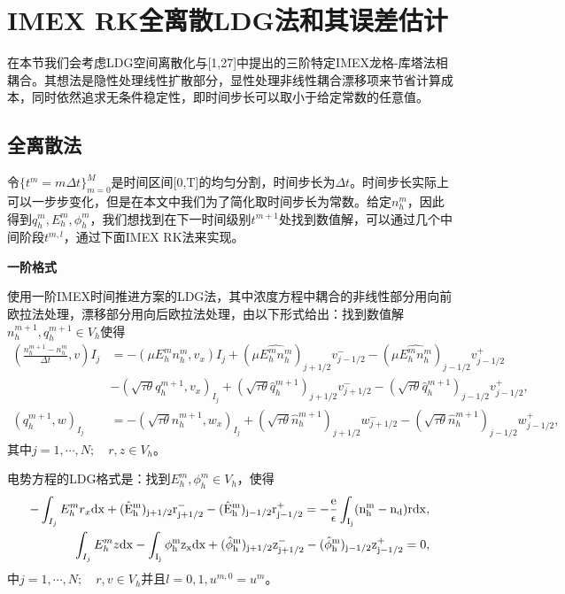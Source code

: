 \documentclass[lang=cn,newtx,10pt,scheme=chinese]{elegantbook}
\begin{document}
\chapter{IMEX RK全离散LDG法和其误差估计}
在本节我们会考虑LDG空间离散化与[1,27]中提出的三阶特定IMEX龙格-库塔法相耦合。其想法是隐性处理线性扩散部分，显性处理非线性耦合漂移项来节省计算成本，同时依然追求无条件稳定性，即时间步长可以取小于给定常数的任意值。
\section{全离散法}
令$\{t^m = m\Delta t\}^M_{m = 0}$是时间区间[0,T]的均匀分割，时间步长为$\Delta t$。时间步长实际上可以一步步变化，但是在本文中我们为了简化取时间步长为常数。给定$n_h^m$，因此得到$q_h^m,E_h^m,\phi_h^m$，我们想找到在下一时间级别$t^{m+1}$处找到数值解，可以通过几个中间阶段$t^{m,l}$，通过下面IMEX RK法来实现。

\noindent \textbf{一阶格式}

使用一阶IMEX时间推进方案的LDG法，其中浓度方程中耦合的非线性部分用向前欧拉法处理，漂移部分用向后欧拉法处理，由以下形式给出：找到数值解$n_h^{m+1},q_h^{m+1}\in V_h$使得
\begin{align}
    (\frac{n_h^{m+1} - n_h^m}{\Delta t},v)I_j & = -(\mu E_h^mn_h^m, v_x)I_j + (\mu \hat{E_h^mn_h^m})_{j+1/2}v_{j-1/2}^- - (\mu\hat{E_h^mn_h^m})_{j-1/2}v^+_{j-1/2}                                         \nonumber                      \\
                                              & -(\sqrt{\tau \theta}q_h^{m+1},v_x)_{I_j} + (\sqrt{\tau \theta}\hat{q}_h^{m+1})_{j+1/2}v_{j+1/2}^- - (\sqrt{\tau \theta}\hat{q}_h^{m+1})_{j-1/2}v_{j-1/2}^+,  \label{weakForm:IMEX1 LDG 1} \\
    (q_h^{m+1},w)_{I_j}                       & = -(\sqrt{\tau \theta}n_h^{m+1},w_x)_{I_j} + (\sqrt{\tau \theta}\hat{n}_h^{m+1})_{j+1/2}w_{j+1/2}^- - (\sqrt{\tau \theta}\hat{n}_h^{m+1})_{j-1/2}w_{j-1/2}^+,\label{weakForm:IMEX1 LDG 2}
\end{align}
其中$j = 1,\cdots,N;\quad r,z \in V_h$。

电势方程的LDG格式是：找到$E_h^{m},\phi_h^{m} \in V_h$，使得
\begin{align}
    -\int_{I_j} E_h^{m}r_x \rm{d}x + (\hat{E}_h^{m})_{j+1/2}r_{j+1/2}^- - (\hat{E}_h^{m})_{j-1/2}r_{j-1/2}^+ = -\frac{e}{\epsilon}\int_{I_j}(n_h^{m} - n_d) r\rm{d} x, \label{equation:IMEX1 LDG:EPE 1} \\
    \int_{I_j} E_h^{m}z \rm{d}x - \int_{I_j} \phi_h^{m}z_x \rm{d}x  + (\hat{\phi}_h^{m})_{j+1/2}z^-_{j+1/2} - (\hat{\phi}_h^{m})_{j-1/2}z_{j-1/2}^+  = 0,\label{equation:IMEX1 LDG:EPE 2}
\end{align}
中$j = 1,\cdots,N;\quad r,v \in V_h$并且$l = 0,1, u^{m,0} = u^m$。
\end{document}
